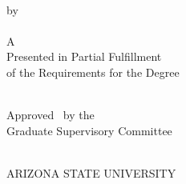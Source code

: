 \begin{center}
  \Title\\[1em] %
  by\\[1em] %
  \Author\\[5em] %
  
  A \DocumentType\ \\ Presented in Partial Fulfillment\\ of the Requirements for the Degree\\ \Degree\\ %
  
  \vfill %
  
  Approved \DefenseDate\ by the\\ Graduate Supervisory Committee\\[1em]
  
  \Members\ %
  
  \vfill %
  
  ARIZONA STATE UNIVERSITY\\ \GraduationDate
  \end{center}